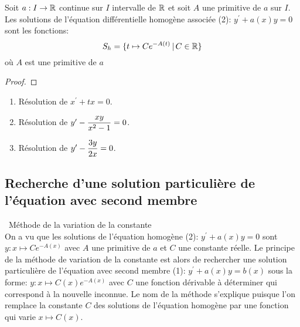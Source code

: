 \documentclass[a4paper, 11pt]{article}
\begin{document}
\begin{theorem} 
Soit $a: I\rightarrow \mathbb{R}$ continue sur $I$ intervalle de $\mathbb{R}$ et soit $A$ une primitive de $a$ sur $I$.\\
\noindent Les solutions de l'\'equation diff\'erentielle homog\`{e}ne associ\'ee (2): $y^{\prime}+a(x)y=0$ sont les fonctions:
$$S_h=\{ t\mapsto C e^{-A(t)}\, |\, C\in \mathbb{R}\}$$ où
$A$ est une primitive de $a$
\end{theorem}
 

\begin{proof} 
\vspace{5cm}

\end{proof}

{\footnotesize \begin{exercice} 
\begin{enumerate}

\item R\'esolution de $x^{\prime}+tx=0$.
\item R\'esolution de $y^{\prime}-\displaystyle\frac{xy}{x^2-1}=0$. 
 

\item R\'esolution de $y^{\prime}-\displaystyle\frac{3y}{2x}=0$. 
 
\end{enumerate}
\end{exercice}
}

\subsection{Recherche d'une solution particuli\`ere de l'\'equation avec second membre}


\noindent\ {M\'ethode de la variation de la constante}\vsec\\
\noindent On a vu que les solutions de l'\'equation homog\`ene (2): $y^{\prime}+a(x)y=0$ sont $y: x\mapsto Ce^{-A(x)}$ avec $A$ une primitive de $a$ et $C$ une constante r\'eelle. Le principe de la m\'ethode de variation de la constante est alors de rechercher une solution particuli\`ere de l'\'equation avec second membre (1): $y^{\prime}+a(x)y=b(x)$ sous la forme: 
$y: x\mapsto C(x)e^{-A(x)}$
avec $C$ une fonction d\'erivable \`a d\'eterminer qui correspond \`a la nouvelle inconnue. Le nom de la m\'ethode s'explique puisque l'on remplace la constante $C$ des solutions de l'\'equation homog\`ene par une fonction qui varie $x\mapsto C(x)$.\vsec
\end{document}
